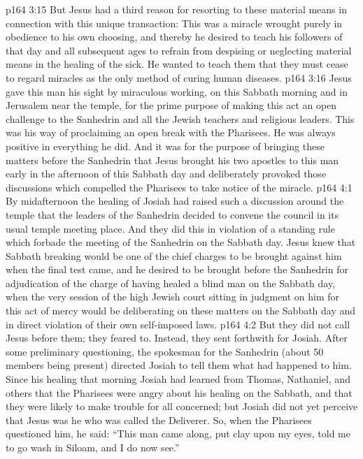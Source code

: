 \vs p164 3:15 \bibnobreakspace But Jesus had a third reason for resorting to these material means in connection with this unique transaction: This was a miracle wrought purely in obedience to his own choosing, and thereby he desired to teach his followers of that day and all subsequent ages to refrain from despising or neglecting material means in the healing of the sick. He wanted to teach them that they must cease to regard miracles as the only method of curing human diseases.
\vs p164 3:16 \pc Jesus gave this man his sight by miraculous working, on this Sabbath morning and in Jerusalem near the temple, for the prime purpose of making this act an open challenge to the Sanhedrin and all the Jewish teachers and religious leaders. This was his way of proclaiming an open break with the Pharisees. He was always positive in everything he did. And it was for the purpose of bringing these matters before the Sanhedrin that Jesus brought his two apostles to this man early in the afternoon of this Sabbath day and deliberately provoked those discussions which compelled the Pharisees to take notice of the miracle.
\vs p164 4:1 By midafternoon the healing of Josiah had raised such a discussion around the temple that the leaders of the Sanhedrin decided to convene the council in its usual temple meeting place. And they did this in violation of a standing rule which forbade the meeting of the Sanhedrin on the Sabbath day. Jesus knew that Sabbath breaking would be one of the chief charges to be brought against him when the final test came, and he desired to be brought before the Sanhedrin for adjudication of the charge of having healed a blind man on the Sabbath day, when the very session of the high Jewish court sitting in judgment on him for this act of mercy would be deliberating on these matters on the Sabbath day and in direct violation of their own self\hyp{}imposed laws.
\vs p164 4:2 But they did not call Jesus before them; they feared to. Instead, they sent forthwith for Josiah. After some preliminary questioning, the spokesman for the Sanhedrin (about 50 members being present) directed Josiah to tell them what had happened to him. Since his healing that morning Josiah had learned from Thomas, Nathaniel, and others that the Pharisees were angry about his healing on the Sabbath, and that they were likely to make trouble for all concerned; but Josiah did not yet perceive that Jesus was he who was called the Deliverer. So, when the Pharisees questioned him, he said: “This man came along, put clay upon my eyes, told me to go wash in Siloam, and I do now see.”
